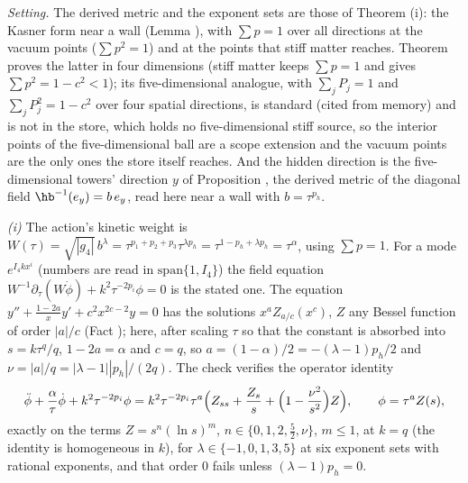 \emph{Setting.} The derived metric and the exponent sets are those of Theorem (i): the Kasner form near a wall (Lemma ), with $\sum p = 1$ over all directions at the vacuum points ($\sum p^{2} = 1$) and at the points that stiff matter reaches. Theorem  proves the latter in four dimensions (stiff matter keeps $\sum p = 1$ and gives $\sum p^{2} = 1 - c^{2} < 1$); its five-dimensional analogue, with $\sum_{j}P_{j} = 1$ and $\sum_{j}P_{j}^{2} = 1 - c^{2}$ over four spatial directions, is standard (cited from memory) and is not in the store, which holds no five-dimensional stiff source, so the interior points of the five-dimensional ball are a scope extension and the vacuum points are the only ones the store itself reaches. And the hidden direction is the five-dimensional towers' direction $y$ of Proposition , the derived metric of the diagonal field $\hb^{-1}(e_{y}) = b\,e_{y}$, read here near a wall with $b = \tau^{p_{h}}$.

\emph{(i)} The action's kinetic weight is $W(\tau) = \sqrt{|g_{4}|}\,b^{\lambda} = \tau^{p_{1} + p_{2} + p_{3}}\tau^{\lambda p_{h}} = \tau^{1 - p_{h} + \lambda p_{h}} = \tau^{\alpha}$, using $\sum p = 1$. For a mode $e^{I_{4}kx^{i}}$ (numbers are read in $\mathrm{span}\{1, I_{4}\}$) the field equation $W^{-1}\partial_{\tau}(W\dot\phi) + k^{2}\tau^{-2p_{i}}\phi = 0$ is the stated one. The equation $y'' + \tfrac{1 - 2a}{x}y' + c^{2}x^{2c - 2}y = 0$ has the solutions $x^{a}Z_{a/c}(x^{c})$, $Z$ any Bessel function of order $|a|/c$ (Fact ); here, after scaling $\tau$ so that the constant is absorbed into $s = k\tau^{q}/q$, $1 - 2a = \alpha$ and $c = q$, so $a = (1 - \alpha)/2 = -(\lambda - 1)p_{h}/2$ and $\nu = |a|/q = |\lambda - 1||p_{h}|/(2q)$. The check verifies the operator identity
\[
\ddot\phi + \frac{\alpha}{\tau}\dot\phi + k^{2}\tau^{-2p_{i}}\phi = k^{2}\tau^{-2p_{i}}\tau^{a}\Bigl(Z_{ss} + \frac{Z_{s}}{s} + \Bigl(1 - \frac{\nu^{2}}{s^{2}}\Bigr)Z\Bigr), \qquad \phi = \tau^{a}Z(s),
\]
exactly on the terms $Z = s^{n}(\ln s)^{m}$, $n \in \{0, 1, 2, \tfrac52, \nu\}$, $m \le 1$, at $k = q$ (the identity is homogeneous in $k$), for $\lambda \in \{-1, 0, 1, 3, 5\}$ at six exponent sets with rational exponents, and that order $0$ fails unless $(\lambda - 1)p_{h} = 0$.

